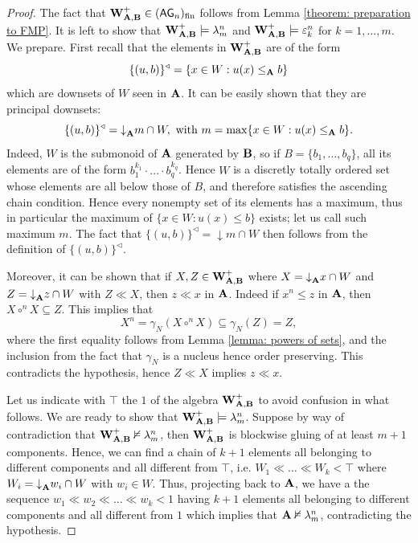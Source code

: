 \documentclass{amsart}
\theoremstyle{definition}
\numberwithin{equation}{section}
\newcommand{\alg}[1]{{\textbf{\upshape #1}}}  %
\newcommand{\vv}[1]{\mathsf {#1}}
\newcommand{\BG}{\vv{AG}}
\begin{document}
\begin{proof}
	The fact that $\alg W_{\alg A, \alg B }^+ \in (\BG_n)_{\rm fin}$ follows from Lemma \ref{theorem: preparation to FMP}. It is left to show that $\alg W_{\alg A, \alg B}^+ \models \lambda_m^n$ and $\alg W_{\alg A, \alg B}^+ \models \varepsilon_k^n$ for $k= 1 , \dots, m$. We prepare.	
	First recall that the elements in $\alg W_{\alg A, \alg B}^+$ are of the form $$\{(u,b)\}^\triangleleft=\{ x \in W : u(x) \leq_{\alg A} b \}$$ which are downsets of $W$ seen in $\alg A$. It can be easily shown that they are principal downsets: $$\{(u,b)\}^\triangleleft={\downarrow}_{\alg A} m \cap W, \mbox{ with } m =\max \{ x \in W : u(x) \leq_{\alg A} b \}.$$ 
	Indeed, $W$ is the submonoid of $\alg A$ generated by $\alg B$, so if $B = \{b_1, \ldots, b_q\}$, all its elements are of the form $b_1^{k_1} \cdot \ldots \cdot b_q^{k_q}$. Hence $W$ is a discretly totally ordered set whose elements are all below those of $B$, and therefore satisfies the ascending chain condition. Hence every nonempty set of its elements has a maximum, thus in particular the maximum of $\{x \in W : u(x) \leq b \}$ exists; let us call such maximum $m$. The fact that $\{(u,b)\}^\triangleleft = {\downarrow m}\cap W$ then follows from the definition of $\{(u,b)\}^\triangleleft$. 
		
	Moreover, it can be shown that if $X, Z \in \alg W_{\alg A, \alg B}^+$ where $X={\downarrow}_{\alg A} x \cap W$ and $Z= {\downarrow}_{\alg A} z \cap W$ with $Z \ll X$, then $z \ll x$ in $\alg A$. Indeed if $x^n \leq z$ in $\alg A$, then $X \circ^{n} X \subseteq Z$. This implies that $$X^n= \gamma_N(X \circ^{n} X) \subseteq \gamma_N(Z)=Z,$$ where the first equality follows from Lemma \ref{lemma: powers of sets}, and the inclusion from the fact that $\gamma_N$ is a nucleus hence order preserving. This contradicts the hypothesis, hence $Z \ll X$ implies $z \ll x$.
	
Let us indicate with $\top$ the $1$ of the algebra $\alg W_{\alg A, \alg B}^+$ to avoid confusion in what follows. We are ready to show that $\alg W_{\alg A, \alg B}^+ \models \lambda_m^n$. Suppose by way of contradiction that $\alg W_{\alg A, \alg B}^+\nvDash \lambda_m^n$, then $\alg W_{\alg A, \alg B}^+$ is blockwise gluing of at least $m+1$ components. Hence, we can find a chain of $k+1$ elements all belonging to different components and all different from $\top$, i.e. $W_1 \ll \dots \ll W_k < \top$ where $W_i={\downarrow}_{\alg A}w_i \cap W$ with $w_i \in W$. Thus, projecting back to $\alg A$, we have a the sequence $w_1 \ll w_2 \ll \dots \ll w_k < 1$ having $k+1$ elements all belonging to different components and all different from $1$ which implies that $\alg A \nvDash \lambda_m^n$, contradicting the hypothesis.


\end{proof}
\end{document}
